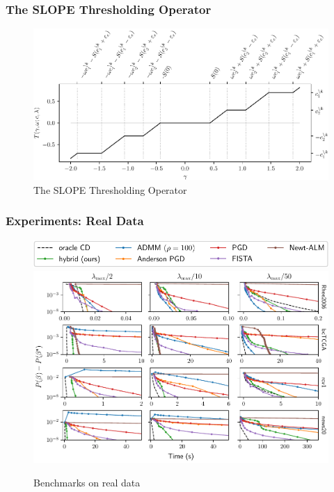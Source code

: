 \documentclass[10pt]{beamer}
\begin{document}
\begin{frame}
  \frametitle{The SLOPE Thresholding Operator}

  \begin{figure}[htpb]
    \centering
    \includegraphics[width=\textwidth]{figures/paper5-slope-thresholding.pdf}
    \caption{%
      The SLOPE Thresholding Operator
    }
  \end{figure}
\end{frame}

\begin{frame}
  \frametitle{Experiments: Real Data}

  \begin{figure}
    \centering
    \includegraphics[scale=0.55]{figures/paper5-real_legend.pdf}
    \includegraphics[scale=0.55]{figures/paper5-real.pdf}
    \caption{%
      Benchmarks on real data
    }
  \end{figure}
\end{frame}
\end{document}
